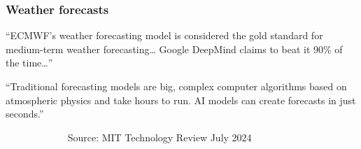 \begin{frame}
    \frametitle{Weather forecasts}
    
    \begin{figure}
       \centering
    \end{figure}

\end{frame}


\begin{frame}

    
    ``ECMWF's weather forecasting model is considered the gold standard for
        medium-term weather forecasting\ldots 
        Google DeepMind claims to beat it 90\% of the time\ldots''

    \vspace{0.5em}
    \vspace{0.5em}

    ``Traditional forecasting models are big, complex computer algorithms based
    on atmospheric physics and take hours to run. AI models can create forecasts
    in just seconds.'' 
    \vspace{0.5em}
    \vspace{0.5em}

    $\quad \qquad$$\quad \qquad$ Source: MIT Technology Review  July 2024



\end{frame}



